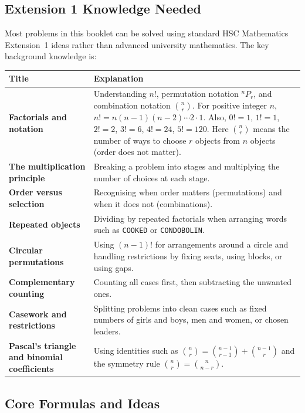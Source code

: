 \documentclass[12pt]{article}
\begin{document}
\subsection{Extension 1 Knowledge Needed}
Most problems in this booklet can be solved using standard HSC Mathematics Extension~1 ideas rather than advanced university mathematics. The key background knowledge is:

\begin{center}
\renewcommand{\arraystretch}{1.25}
\begin{tabular}{|p{}|p{}|}
\hline
\textbf{Title} & \textbf{Explanation} \\
\hline
\textbf{Factorials and notation} & Understanding $n!$, permutation notation ${}^nP_r$, and combination notation $\binom{n}{r}$. For positive integer $n$, $n!=n(n-1)(n-2)\cdots 2\cdot 1$. Also, $0!=1$, $1!=1$, $2!=2$, $3!=6$, $4!=24$, $5!=120$. Here $\binom{n}{r}$ means the number of ways to choose $r$ objects from $n$ objects (order does not matter). \\
\hline
\textbf{The multiplication principle} & Breaking a problem into stages and multiplying the number of choices at each stage. \\
\hline
\textbf{Order versus selection} & Recognising when order matters (permutations) and when it does not (combinations). \\
\hline
\textbf{Repeated objects} & Dividing by repeated factorials when arranging words such as \texttt{COOKED} or \texttt{CONDOBOLIN}. \\
\hline
\textbf{Circular permutations} & Using $(n-1)!$ for arrangements around a circle and handling restrictions by fixing seats, using blocks, or using gaps. \\
\hline
\textbf{Complementary counting} & Counting all cases first, then subtracting the unwanted ones. \\
\hline
\textbf{Casework and restrictions} & Splitting problems into clean cases such as fixed numbers of girls and boys, men and women, or chosen leaders. \\
\hline
\textbf{Pascal's triangle and binomial coefficients} & Using identities such as $\binom{n}{r}=\binom{n-1}{r-1}+\binom{n-1}{r}$ and the symmetry rule $\binom{n}{r}=\binom{n}{n-r}$. \\
\hline
\end{tabular}
\end{center}

\subsection{Core Formulas and Ideas}
\end{document}
